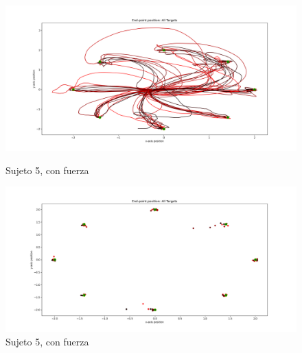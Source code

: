 \documentclass[a4paper,11pt, oneside]{book}
\begin{document}
\begin{figure}[H]
	\begin{minipage}[b]{0.5\linewidth}
		\centering
		\includegraphics[width=\linewidth]{sujeto5/force/trayectorias}
		\caption{Sujeto 5, con fuerza}
		\label{fig:figura1}
	\end{minipage}
	\hspace{0.5cm}
	\begin{minipage}[b]{0.5\linewidth}
		\centering
		\includegraphics[width=\linewidth]{sujeto5/force/trayectorias_puntos}
		\caption{Sujeto 5, con fuerza}
		\label{fig:figura2}
	\end{minipage}
\end{figure}
\end{document}
